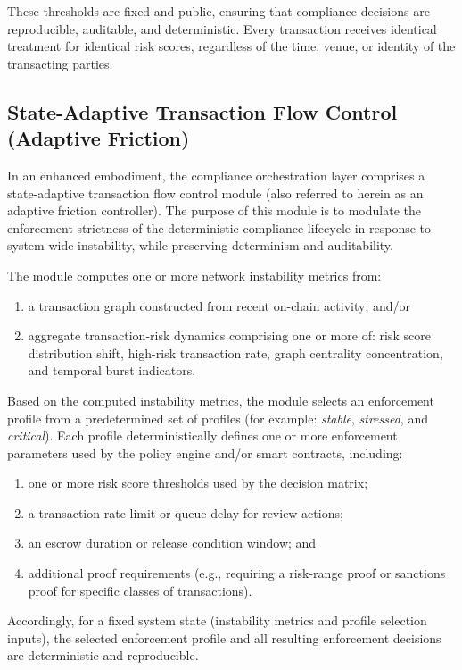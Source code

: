 \documentclass[12pt,a4paper]{article}
\begin{document}
These thresholds are fixed and public, ensuring that compliance decisions are 
reproducible, auditable, and deterministic. Every transaction receives 
identical treatment for identical risk scores, regardless of the time, 
venue, or identity of the transacting parties.

\subsection{State-Adaptive Transaction Flow Control (Adaptive Friction)}

In an enhanced embodiment, the compliance orchestration layer comprises a 
state-adaptive transaction flow control module (also referred to herein as an 
adaptive friction controller). The purpose of this module is to modulate the 
enforcement strictness of the deterministic compliance lifecycle in response 
to system-wide instability, while preserving determinism and auditability.

The module computes one or more network instability metrics from:
\begin{enumerate}[label=(\alph*)]
\item a transaction graph constructed from recent on-chain activity; and/or
\item aggregate transaction-risk dynamics comprising one or more of: 
risk score distribution shift, high-risk transaction rate, graph centrality 
concentration, and temporal burst indicators.
\end{enumerate}

Based on the computed instability metrics, the module selects an enforcement 
profile from a predetermined set of profiles (for example: \textit{stable}, 
\textit{stressed}, and \textit{critical}). Each profile deterministically 
defines one or more enforcement parameters used by the policy engine and/or 
smart contracts, including:
\begin{enumerate}[label=(\alph*)]
\item one or more risk score thresholds used by the decision matrix;
\item a transaction rate limit or queue delay for review actions;
\item an escrow duration or release condition window; and
\item additional proof requirements (e.g., requiring a risk-range proof or 
sanctions proof for specific classes of transactions).
\end{enumerate}

Accordingly, for a fixed system state (instability metrics and profile 
selection inputs), the selected enforcement profile and all resulting 
enforcement decisions are deterministic and reproducible.
\end{document}
